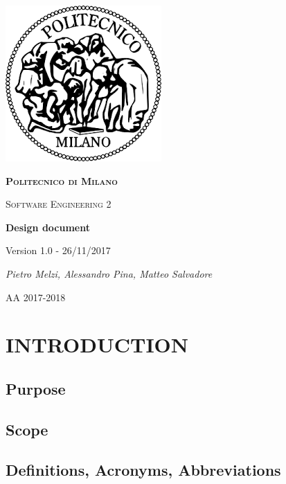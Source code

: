 \documentclass[11pt]{report}
\begin{document}
	\begin{titlepage}
		\centering
		\includegraphics{logo.png}\par\vspace{1cm}
		{\scshape\LARGE\bfseries Politecnico di Milano \par}
		\vspace{1cm}
		{\scshape\Large Software Engineering 2\par}
		\vspace{1.5cm}
		{\Huge\bfseries Design document\par}
		\vspace{1cm}
		{\small Version 1.0 - 26/11/2017\par}
		\vspace{4cm}
		{\Large\itshape Pietro Melzi, Alessandro Pina, Matteo Salvadore\par}

		\vfill

		{\large AA 2017-2018\par}
	\end{titlepage}

	\tableofcontents{}

	\chapter{INTRODUCTION}
	\label{ch:INTRODUCTION}
	
		\section{Purpose}
		\label{sect:Purpose}
			
		\section{Scope}
		\label{sect:Scope}
			
		\section{Definitions, Acronyms, Abbreviations}
		\label{sect:Definitions, Acronyms, Abbreviations}
			
\end{document}
